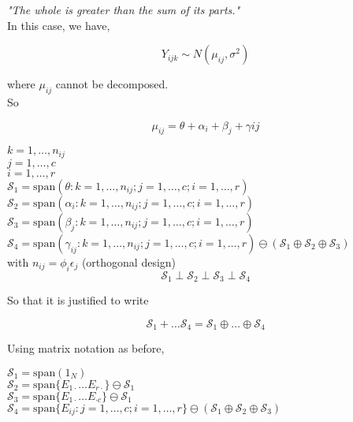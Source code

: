 \documentclass[11pt,fleqn]{book} %
\begin{document}
\textit{"The whole is greater than the sum of its parts."}\\

In this case, we have, 

		$$Y_{ijk} \sim N(\mu_{ij}, \sigma^2) $$

where $\mu_{ij}$ cannot be decomposed. \\

So 

		$$\mu_{ij} = \theta + \alpha_i + \beta_j + \gamma{ij} $$

$k = 1, \dots, n_{ij}$\\
$ j = 1, \dots, c$\\
$ i = 1, \dots, r $\\

$\mathcal{S}_1 = \text{span}(\theta: k = 1, \dots, n_{ij}; j = 1, \dots, c; i = 1, \dots, r )$\\

$\mathcal{S}_2 = \text{span}(\alpha_i: k = 1, \dots, n_{ij}; j = 1, \dots, c; i = 1, \dots, r )$\\

$\mathcal{S}_3 = \text{span}(\beta_j: k = 1, \dots, n_{ij}; j = 1, \dots, c; i = 1, \dots, r )$\\

$\mathcal{S}_4 = \text{span}(\gamma_{ij}: k = 1, \dots, n_{ij}; j = 1, \dots, c; i = 1, \dots, r )\ominus (\mathcal{S}_1 \oplus \mathcal{S}_2 \oplus \mathcal{S}_3)$\\

with $n_{ij} = \phi_i \epsilon_j$ (orthogonal design)\\

		$$\mathcal{S}_1 \perp \mathcal{S}_2 \perp \mathcal{S}_3 \perp \mathcal{S}_4 $$

So that it is justified to write

		$$\mathcal{S}_1 + \dots \mathcal{S}_4 = \mathcal{S}_1 \oplus \dots \oplus \mathcal{S}_4$$

Using matrix notation as before, 


$\mathcal{S}_1 = \text{span}(1_N)$\\

$\mathcal{S}_2 = \text{span}\{E_{1\cdot} \dots E_{r \cdot}\} \ominus \mathcal{S}_1$\\

$\mathcal{S}_3 = \text{span}\{E_{1\cdot} \dots E_{ \cdot c}\} \ominus \mathcal{S}_1$\\

$\mathcal{S}_4 = \text{span}\{E_{ij}:j = 1, \dots, c; i = 1, \dots, r \} \ominus (\mathcal{S}_1 \oplus \mathcal{S}_2 \oplus \mathcal{S}_3)$\\
\end{document}
